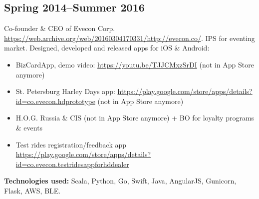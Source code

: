 \subsection*{Spring 2014--Summer 2016}

Co-founder \& CEO of Evecon Corp.
\href{https://web.archive.org/web/20160304170331/http://evecon.co/}{\url{https://web.archive.org/web/20160304170331/http://evecon.co/}}.
IPS for eventing market. Designed, developed and released apps for iOS \& Android:
\begin{itemize}[noitemsep]
  \item BizCardApp, demo video: \href{https://youtu.be/TJJCMxzSrDI}{\url{https://youtu.be/TJJCMxzSrDI}} (not in App Store anymore)
  \item St. Petersburg Harley Days app: \href{https://play.google.com/store/apps/details?id=co.evecon.hdprototype}{\url{https://play.google.com/store/apps/details?id=co.evecon.hdprototype}} (not in App Store anymore)
  \item H.O.G. Russia \& CIS (not in App Store anymore) + BO for loyalty programs \& events
  \item Test rides registration/feedback app \href{https://play.google.com/store/apps/details?id=co.evecon.testridesappforhddealer}{\url{https://play.google.com/store/apps/details?id=co.evecon.testridesappforhddealer}}
\end{itemize}

\textbf{Technologies used:}
Scala, Python, Go, Swift, Java, AngularJS, Gunicorn, Flask, AWS, BLE.
